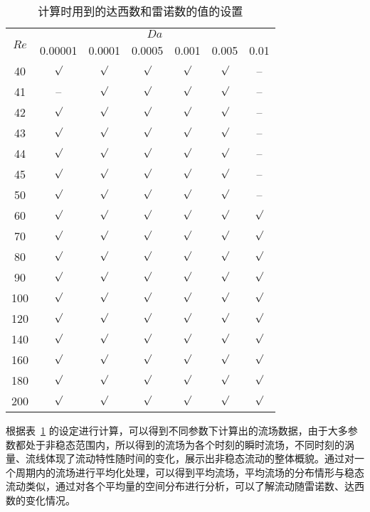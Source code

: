 \begin{table}
	\caption{计算时用到的达西数和雷诺数的值的设置}\label{tab: DaRe}
	\vspace{.5em}\centering\wuhao
	\begin{tabular}{*{7}{c}}
		\toprule[1.5pt]
		\multirow{2}[3]{*}{$Re$} & \multicolumn{6}{c}{$Da$} \\
		\cmidrule[.67pt](lr){2-7}
		& 0.00001 & 0.0001 & 0.0005 & 0.001 & 0.005 & 0.01 \\
		\midrule[1pt]
		40  & $\surd$ & $\surd$ & $\surd$ & $\surd$ & $\surd$ & -- \\
		41  & --      & $\surd$ & $\surd$ & $\surd$ & $\surd$ & -- \\
		42  & $\surd$ & $\surd$ & $\surd$ & $\surd$ & $\surd$ & -- \\
		43  & $\surd$ & $\surd$ & $\surd$ & $\surd$ & $\surd$ & -- \\
		44  & $\surd$ & $\surd$ & $\surd$ & $\surd$ & $\surd$ & -- \\
		45  & $\surd$ & $\surd$ & $\surd$ & $\surd$ & $\surd$ & -- \\
		50  & $\surd$ & $\surd$ & $\surd$ & $\surd$ & $\surd$ & -- \\
		60  & $\surd$ & $\surd$ & $\surd$ & $\surd$ & $\surd$ & $\surd$ \\
		70  & $\surd$ & $\surd$ & $\surd$ & $\surd$ & $\surd$ & $\surd$ \\
		80  & $\surd$ & $\surd$ & $\surd$ & $\surd$ & $\surd$ & $\surd$ \\
		90  & $\surd$ & $\surd$ & $\surd$ & $\surd$ & $\surd$ & $\surd$ \\
		100 & $\surd$ & $\surd$ & $\surd$ & $\surd$ & $\surd$ & $\surd$ \\
		120 & $\surd$ & $\surd$ & $\surd$ & $\surd$ & $\surd$ & $\surd$ \\
		140 & $\surd$ & $\surd$ & $\surd$ & $\surd$ & $\surd$ & $\surd$ \\
		160 & $\surd$ & $\surd$ & $\surd$ & $\surd$ & $\surd$ & $\surd$ \\
		180 & $\surd$ & $\surd$ & $\surd$ & $\surd$ & $\surd$ & $\surd$ \\
		200 & $\surd$ & $\surd$ & $\surd$ & $\surd$ & $\surd$ & $\surd$ \\
		\bottomrule[1.5pt]
	\end{tabular}
\end{table}

根据表~\ref{tab: DaRe} 的设定进行计算，可以得到不同参数下计算出的流场数据，由于大多参数都处于非稳态范围内，所以得到的流场为各个时刻的瞬时流场，不同时刻的涡量、流线体现了流动特性随时间的变化，展示出非稳态流动的整体概貌。通过对一个周期内的流场进行平均化处理，可以得到平均流场，平均流场的分布情形与稳态流动类似，通过对各个平均量的空间分布进行分析，可以了解流动随雷诺数、达西数的变化情况。

